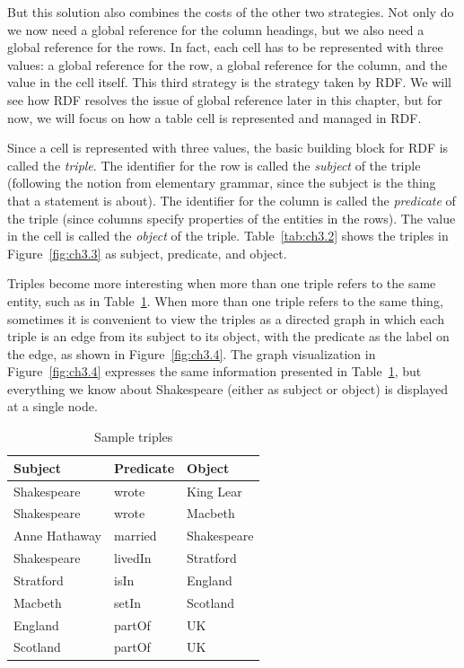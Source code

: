 But this solution also combines the costs of the other two strategies.
Not only do we now need a global reference for the column headings, but
we also need a global reference for the rows. In fact, each cell has to
be represented with three values: a global reference for the row, a
global reference for the column, and the value in the cell itself. This
third strategy is the strategy taken by RDF. We will see how RDF
resolves the issue of global reference later in this chapter, but for
now, we will focus on how a table cell is represented and managed in
RDF.

Since a cell is represented with three values, the basic building block
for RDF is called the \emph{triple}. The identifier for the row is called the
\emph{subject} of the triple (following the notion from elementary grammar,
since the subject is the thing that a statement is about). The
identifier for the column is called the \emph{predicate} of the triple (since
columns specify properties of the entities in the rows). The value in
the cell is called the \emph{object} of the triple. Table~\ref{tab:ch3.2} shows the triples
in Figure~\ref{fig:ch3.3} as subject, predicate, and object.

Triples become more interesting when more than one triple refers to the
same entity, such as in Table~\ref{tab:ch3.3}. When more than one triple refers to
the same thing, sometimes it is convenient to view the triples as a
directed graph in which each triple is an edge from its subject to its
object, with the predicate as the label on the edge, as shown in Figure~\ref{fig:ch3.4}. The graph 
visualization in Figure~\ref{fig:ch3.4} expresses the same
information presented in Table~\ref{tab:ch3.3}, but everything we know about
Shakespeare (either as subject or object) is displayed at a single node.

\begin{table}[h]
\centering
\begin{tabular}{||l l l||} 
 \hline
 Subject&Predicate&Object \\ [0.5ex] 
 \hline\hline
Shakespeare&wrote&King Lear \\
Shakespeare&wrote&Macbeth \\
Anne Hathaway&married&Shakespeare \\
Shakespeare&livedIn&Stratford \\
Stratford&isIn&England\\
Macbeth&setIn&Scotland\\
England&partOf&UK \\
Scotland&partOf&UK \\
\hline
\end{tabular}
\caption{Sample triples}
\label{tab:ch3.3}
\end{table}




